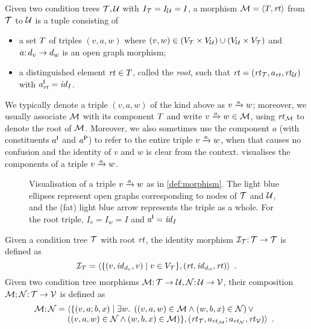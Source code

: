 \begin{definition}[morphism]\label{def:morphism}
Given two condition trees $\cT,\cU$ with $I_\cT=I_\cU=I$, a morphism $\cM=\tupof{\tp,\rt}$ from $\cT$ to $\cU$ is a tuple consisting of
\begin{itemize}
\item a set $\tp$ of triples $(v,a,w)$ where $(v,w)\in (V_\cT\times V_\cU) \cup (V_\cU\times V_\cT)$ and $a\of d_v\to d_w$ is an open graph morphism;
\item a distinguished element $\rt\in\tp$, called the \emph{root}, such that $\rt=(\rtof\cT,a_{\rt},\rtof\cU)$ with $a_{\rt}\I=\id_I$.
\end{itemize}
\end{definition}
%
We typically denote a triple $(v,a,w)$ of the kind above as $\trip vaw$; moreover, we usually associate $\cM$ with its component $\tp$ and write $\trip vaw\in\cM$, using $\rtof\cM$ to denote the root of $\cM$. Moreover, we also sometimes use the component $a$ (with constituents $a\I$ and $a\P$) to refer to the entire triple $\trip vaw$, when that causes no confusion and the identity of $v$ and $w$ is clear from the context.  visualises the components of a triple $\trip vaw$.

\begin{figure}
\centering

\caption{Visualisation of a triple $\trip vaw$ as in \cref{def:morphism}. The light blue ellipses represent open graphs corresponding to nodes of $\cT$ and $\cU$, and the (fat) light blue arrow represents the triple as a whole. For the root triple, $I_v=I_w=I$ and $a\I=\id_I$}
\label{fig:triple}
\end{figure}
\begin{comment}
\todo[inline]{We could extend the child relation to triples, as follows.}
\noindent Given a morphism $\cM$, we define a parent relation ${\parentof}\subseteq \cM\times \cM$ as follows:
\[ (v,a,w)\parentof (y,b,x) \;\Leftrightarrow\; v\parentof x\wedge w\parentof y \wedge u_y=b\I;u_x;a\P \enspace. \]
\todo[inline]{This might provide a more acceresible and uniform way to define the notions of direct (preservation and reflection) evidence.}
\end{comment}
%
Given a condition tree $\cT$ with root $\rt$, the identity morphism $\cI_\cT\of \cT\to\cT$ is defined as
\[ \cI_\cT = \tupof{\gensetof{(v,\id_{d_v},v)}{v\in V_\cT},(\rt,\id_{d_{\rt}},\rt)} \enspace. \]
Given two condition tree morphisms $\cM\of \cT\to \cU,\cN\of \cU\to \cV$, their composition $\cM;\cN\of \cT\to \cV$ is defined as
\[ \cM;\cN =
\begin{array}[t]{@{}l}
	\langle\{ (v,a;b,x) \mid \exists w\st \left( (v,a,w) \in \cM \wedge (w,b,x)\in \cN\right) \vee\\ 
	\left( (v,a,w) \in \cN \wedge (w,b,x)\in \cM\right)\},(\rtof\cT,a_{\rtof\cM};a_{\rtof\cN},\rtof\cV)\rangle\enspace.
\end{array}
\]
